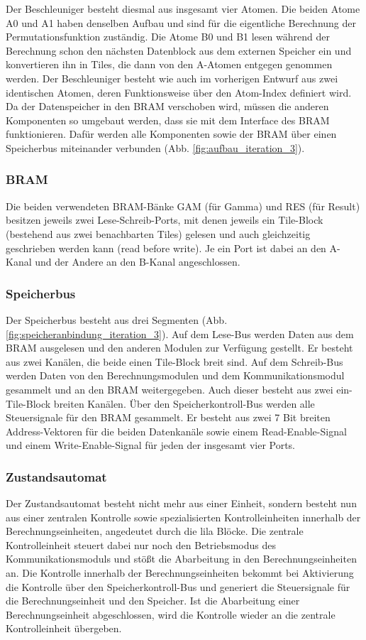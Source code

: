 Der Beschleuniger besteht diesmal aus insgesamt vier Atomen. Die beiden Atome A0 und A1 haben denselben Aufbau und sind für die eigentliche Berechnung der Permutationsfunktion zuständig.
Die Atome B0 und B1 lesen während der Berechnung schon den nächsten Datenblock aus dem externen Speicher ein und konvertieren ihn in Tiles, die dann von den A-Atomen entgegen genommen werden.
Der Beschleuniger besteht wie auch im vorherigen Entwurf aus zwei identischen Atomen, deren Funktionsweise über den Atom-Index definiert wird.
Da der Datenspeicher in den BRAM verschoben wird, müssen die anderen Komponenten so umgebaut werden, dass sie mit dem Interface des BRAM funktionieren.
Dafür werden alle Komponenten sowie der BRAM über einen Speicherbus miteinander verbunden (Abb. \ref{fig:aufbau_iteration_3}).

\subsubsection{BRAM}
Die beiden verwendeten BRAM-Bänke GAM (für Gamma) und RES (für Result) besitzen jeweils zwei Lese-Schreib-Ports, mit denen jeweils ein Tile-Block (bestehend aus zwei benachbarten Tiles) gelesen und auch gleichzeitig geschrieben werden kann (read before write).
Je ein Port ist dabei an den A-Kanal und der Andere an den B-Kanal angeschlossen. 

\subsubsection{Speicherbus}
Der Speicherbus besteht aus drei Segmenten (Abb. \ref{fig:speicheranbindung_iteration_3}). Auf dem Lese-Bus werden Daten aus dem BRAM ausgelesen und den anderen Modulen zur Verfügung gestellt.
Er besteht aus zwei Kanälen, die beide einen Tile-Block breit sind.
Auf dem Schreib-Bus werden Daten von den Berechnungsmodulen und dem Kommunikationsmodul gesammelt und an den BRAM weitergegeben.
Auch dieser besteht aus zwei ein-Tile-Block breiten Kanälen.
Über den Speicherkontroll-Bus werden alle Steuersignale für den BRAM gesammelt. Er besteht aus zwei 7 Bit breiten Address-Vektoren für die beiden Datenkanäle
sowie einem Read-Enable-Signal und einem Write-Enable-Signal für jeden der insgesamt vier Ports.

\subsubsection{Zustandsautomat}
Der Zustandsautomat besteht nicht mehr aus einer Einheit, sondern besteht nun aus einer zentralen Kontrolle sowie spezialisierten Kontrolleinheiten innerhalb der Berechnungseinheiten, angedeutet durch die lila Blöcke.
Die zentrale Kontrolleinheit steuert dabei nur noch den Betriebsmodus des Kommunikationsmoduls und stößt die Abarbeitung in den Berechnungseinheiten an.
Die Kontrolle innerhalb der Berechnungseinheiten bekommt bei Aktivierung die Kontrolle über den Speicherkontroll-Bus und generiert die Steuersignale für die Berechnungseinheit und den Speicher.
Ist die Abarbeitung einer Berechnungseinheit abgeschlossen, wird die Kontrolle wieder an die zentrale Kontrolleinheit übergeben.

